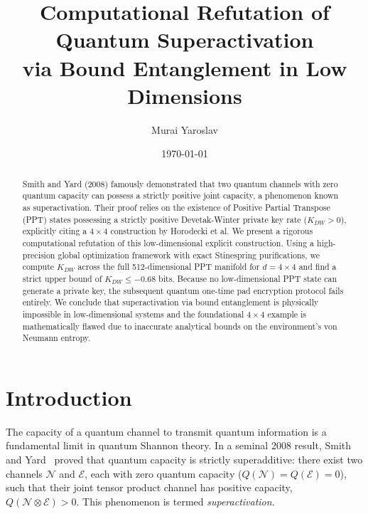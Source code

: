 \documentclass[twocolumn,prl,aps,superscriptaddress,floatfix]{revtex4-2}
\begin{document}
\title{Computational Refutation of Quantum Superactivation\\
via Bound Entanglement in Low Dimensions}

\author{Murai Yaroslav}

\date{\today}

\begin{abstract}
Smith and Yard (2008) famously demonstrated that two quantum channels with zero quantum capacity can possess a strictly positive joint capacity, a phenomenon known as superactivation. Their proof relies on the existence of Positive Partial Transpose (PPT) states possessing a strictly positive Devetak-Winter private key rate ($K_{DW} > 0$), explicitly citing a $4 \times 4$ construction by Horodecki et al. We present a rigorous computational refutation of this low-dimensional explicit construction. Using a high-precision global optimization framework with exact Stinespring purifications, we compute $K_{DW}$ across the full 512-dimensional PPT manifold for $d=4 \times 4$ and find a strict upper bound of $K_{DW} \le -0.68$ bits. Because no low-dimensional PPT state can generate a private key, the subsequent quantum one-time pad encryption protocol fails entirely. We conclude that superactivation via bound entanglement is physically impossible in low-dimensional systems and the foundational $4 \times 4$ example is mathematically flawed due to inaccurate analytical bounds on the environment's von Neumann entropy.
\end{abstract}

\maketitle

\section{Introduction}

The capacity of a quantum channel to transmit quantum information is a fundamental limit in quantum Shannon theory. In a seminal 2008 result, Smith and Yard~\cite{SmithYard2008} proved that quantum capacity is strictly superadditive: there exist two channels $\mathcal{N}$ and $\mathcal{E}$, each with zero quantum capacity ($Q(\mathcal{N}) = Q(\mathcal{E}) = 0$), such that their joint tensor product channel has positive capacity, $Q(\mathcal{N} \otimes \mathcal{E}) > 0$. This phenomenon is termed \emph{superactivation}.
\end{document}
